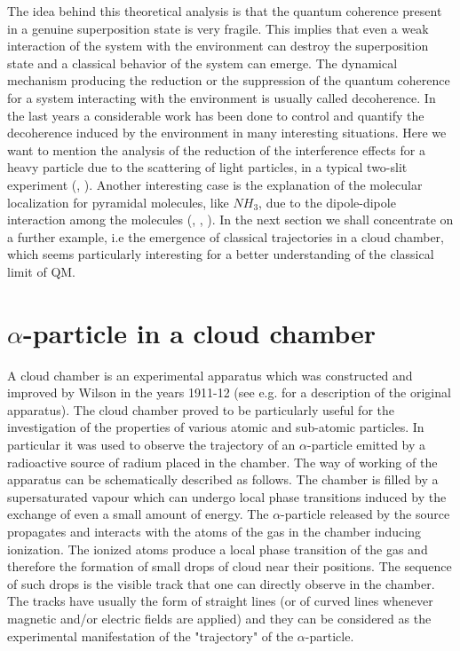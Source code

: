 \documentclass[12pt,reqno]{amsart}
\newcommand{\n}{\relax}
\newcommand{\vs}{\vspace{0.5cm}}
\numberwithin{equation}{section}
\begin{document}
\n
The idea behind this theoretical analysis is that the quantum coherence  present in a genuine superposition state is very fragile. This implies that even a weak interaction of the system with the environment can destroy the superposition state and a classical behavior of the system can emerge. The dynamical mechanism producing the reduction or the suppression of the quantum coherence for a system interacting with the environment is usually called decoherence. In the last years a considerable work has been done to control and quantify the decoherence induced by the environment in many interesting situations. Here we want to  mention the analysis of the reduction of the interference effects for a heavy particle due to the scattering of light particles, in a typical  two-slit experiment (\cite{jz}, \cite{hs}). Another  interesting case is the explanation of the molecular localization for  pyramidal molecules, like $NH_3$, due to the dipole-dipole interaction among the molecules (\cite{cj}, \cite{jpt}, \cite{gms}). 
In the next section we shall concentrate on a further example, i.e the emergence of classical trajectories in a cloud chamber, which seems particularly interesting for a better understanding of the classical limit of QM.







\vs

\vs
\section{$\alpha$-particle in a cloud chamber}

\vs
\n
A cloud chamber is an experimental apparatus which was constructed and improved by Wilson in the years 1911-12 (see e.g. \cite{lr} for a description of the original apparatus). The cloud chamber proved to be particularly useful for the investigation of the properties of  various atomic and sub-atomic particles. %
In particular it was used to observe the trajectory of an $\alpha$-particle emitted by a radioactive source of radium placed in the chamber. The way of working  of the apparatus can be schematically described as follows. The chamber is filled by a supersaturated  vapour which can undergo local phase transitions induced by the exchange of even  a small amount  of  energy. The $\alpha$-particle released  by the source propagates   and interacts with the atoms of the gas in the chamber inducing ionization. The ionized atoms  produce a local phase transition of the gas  and therefore the formation of small drops of cloud near their positions. The sequence of such drops is the visible track that one can directly observe in the chamber. The tracks have usually the form of straight lines (or of curved lines whenever  magnetic and/or electric  fields are  applied) and they can be considered as the experimental manifestation of the "trajectory" of the $\alpha$-particle. 
\end{document}
